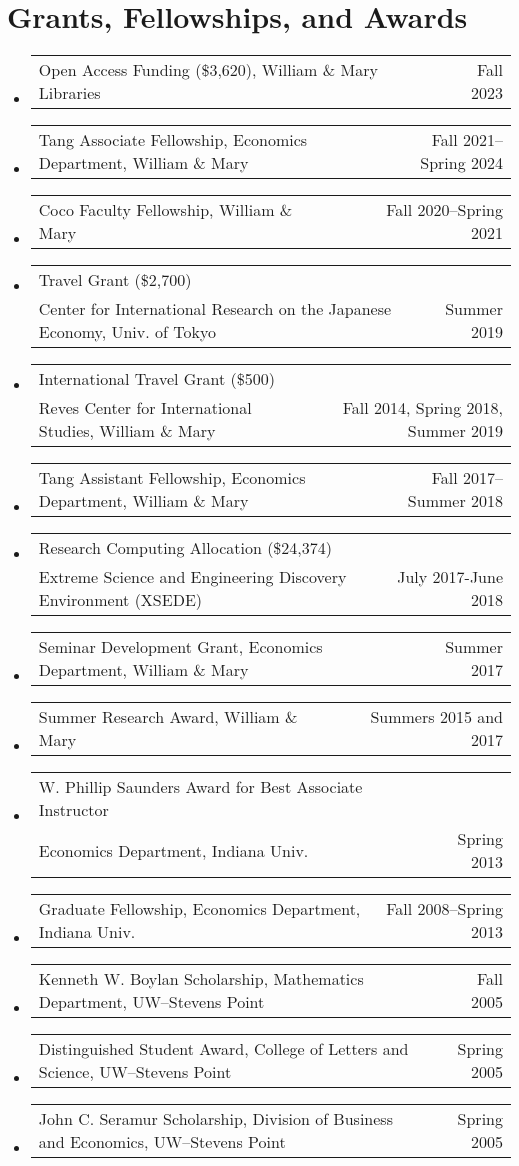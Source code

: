 \documentclass[10pt,letterpaper,en-US]{article}
\makeatletter
\newcommand{\itemrow}[2]
{\begin{tabular*}{\linewidth}{l@{\extracolsep{\fill}}r}
	#1 & #2 \\
\end{tabular*}}
\makeatother
\begin{document}
\section*{Grants, Fellowships, and Awards}
\begin{itemize}
\item \itemrow{Open Access Funding (\$3,620), William \& Mary Libraries}{Fall 2023}
\item \itemrow{Tang Associate Fellowship, Economics Department, William \& Mary}{Fall 2021--Spring 2024}
\item \itemrow{Coco Faculty Fellowship, William \& Mary}{Fall 2020--Spring 2021}
\item \itemrow{Travel Grant (\$2,700) \\ Center for International Research on the Japanese Economy, Univ. of Tokyo}{Summer 2019}
\item \itemrow{International Travel Grant (\$500) \\ Reves Center for International Studies, William \& Mary}{Fall 2014, Spring 2018, Summer 2019}
\item \itemrow{Tang Assistant Fellowship, Economics Department, William \& Mary}{Fall 2017--Summer 2018}
\item \itemrow{Research Computing Allocation (\$24,374)\\
Extreme Science and Engineering Discovery Environment (XSEDE)}{July 2017-June 2018}
\item \itemrow{Seminar Development Grant, Economics Department, William \& Mary}{Summer 2017}
\item \itemrow{Summer Research Award, William \& Mary}{Summers 2015 and 2017}
\item \itemrow{W. Phillip Saunders Award for Best Associate Instructor \\
Economics Department, Indiana Univ.}{Spring 2013}
\item \itemrow{Graduate Fellowship, Economics Department, Indiana Univ.}{Fall 2008--Spring 2013}
\item \itemrow{Kenneth W. Boylan Scholarship, Mathematics Department, UW--Stevens Point}{Fall 2005}
\item \itemrow{Distinguished Student Award, College of Letters and Science, UW--Stevens Point}{Spring 2005}
\item \itemrow{John C. Seramur Scholarship, Division of Business and Economics, UW--Stevens Point}{Spring 2005}
\end{itemize}
\newpage
\end{document}
